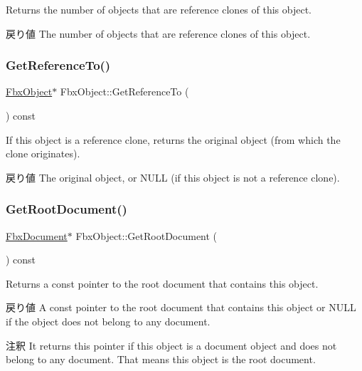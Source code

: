 Returns the number of objects that are reference clones of this object. \begin{DoxyReturn}{戻り値}
The number of objects that are reference clones of this object. 
\end{DoxyReturn}
\mbox{\label{class_fbx_object_a1ba2b3e81083122497ab033c642cbfb8}} 
\subsubsection{\texorpdfstring{Get\+Reference\+To()}{GetReferenceTo()}}
{\footnotesize\ttfamily \hyperlink{class_fbx_object}{Fbx\+Object}$\ast$ Fbx\+Object\+::\+Get\+Reference\+To (\begin{DoxyParamCaption}{ }\end{DoxyParamCaption}) const}

If this object is a reference clone, returns the original object (from which the clone originates). \begin{DoxyReturn}{戻り値}
The original object, or N\+U\+LL (if this object is not a reference clone). 
\end{DoxyReturn}
\mbox{\label{class_fbx_object_a35553dcf1f5290c92b10c7246a5d685b}} 
\subsubsection{\texorpdfstring{Get\+Root\+Document()}{GetRootDocument()}}
{\footnotesize\ttfamily \hyperlink{class_fbx_document}{Fbx\+Document}$\ast$ Fbx\+Object\+::\+Get\+Root\+Document (\begin{DoxyParamCaption}{ }\end{DoxyParamCaption}) const}

Returns a const pointer to the root document that contains this object. \begin{DoxyReturn}{戻り値}
A const pointer to the root document that contains this object or {\ttfamily N\+U\+LL} if the object does not belong to any document. 
\end{DoxyReturn}
\begin{DoxyRemark}{注釈}
It returns this pointer if this object is a document object and does not belong to any document. That means this object is the root document. 
\end{DoxyRemark}
\mbox{\label{class_fbx_object_ad81de7de1ede009e3d80361450620475}} 

